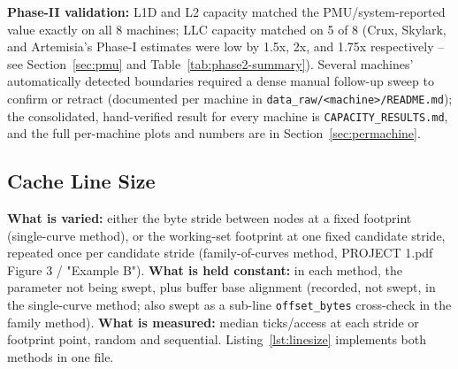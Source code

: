 \documentclass{article}
\begin{document}
\textbf{Phase-II validation:} L1D and L2 capacity matched the PMU/system-reported value
exactly on all 8 machines; LLC capacity matched on 5 of 8 (Crux, Skylark, and Artemisia's
Phase-I estimates were low by 1.5x, 2x, and 1.75x respectively -- see
Section~\ref{sec:pmu} and Table~\ref{tab:phase2-summary}). Several machines'
automatically detected boundaries required a dense manual follow-up sweep to confirm or
retract (documented per machine in \texttt{data\_raw/<machine>/README.md}); the
consolidated, hand-verified result for every machine is \texttt{CAPACITY\_RESULTS.md}, and
the full per-machine plots and numbers are in Section~\ref{sec:permachine}.

\subsection{Cache Line Size}
\label{sec:linesize}

\textbf{What is varied:} either the byte stride between nodes at a fixed footprint
(single-curve method), or the working-set footprint at one fixed candidate stride,
repeated once per candidate stride (family-of-curves method, PROJECT 1.pdf Figure 3 /
"Example B"). \textbf{What is held constant:} in each method, the parameter not being
swept, plus buffer base alignment (recorded, not swept, in the single-curve method; also
swept as a sub-line \texttt{offset\_bytes} cross-check in the family method).
\textbf{What is measured:} median ticks/access at each stride or footprint point, random
and sequential. Listing~\ref{lst:linesize} implements both methods in one file.
\end{document}
